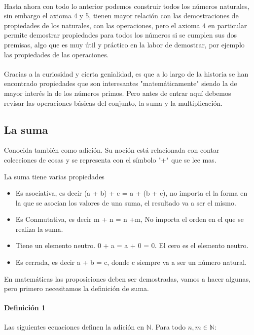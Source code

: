 \documentclass{article}
\begin{document}
\paragraph{} Hasta ahora con todo lo anterior podemos construir todos los números naturales, sin embargo el axioma 4 y 5, tienen mayor relación con las demostraciones de propiedades de los naturales, con las operaciones, pero el axioma 4 en particular permite demostrar propiedades para todos los números si se cumplen sus dos premisas, algo que es muy útil y práctico en la labor de demostrar, por ejemplo las propiedades de las operaciones.

\paragraph{} Gracias a la curiosidad y cierta genialidad, es que a lo largo de la historia se han encontrado propiedades que son interesantes "matemáticamente" siendo la de mayor interés la de los números primos. Pero antes de entrar aquí debemos revisar las operaciones básicas del conjunto, la suma y la multiplicación.

\subsection{La suma}

Conocida también como adición. Su noción está relacionada con contar colecciones de cosas y se representa con el símbolo "+" que se lee mas.

La suma tiene varias propiedades

\begin{itemize}
    \item Es asociativa, es decir (a + b) + c = a + (b + c), no importa el la forma en la que se asocian los valores de una suma, el resultado va a ser el mismo.
    \item Es Conmutativa, es decir m + n = n +m, No importa el orden en el que se realiza la suma.
    \item Tiene un elemento neutro.  0 + a = a + 0 = 0. El cero es el elemento neutro.
    \item Es cerrada, es decir a + b = c, donde c siempre va a ser un número natural.
\end{itemize}

En matemáticas las proposiciones deben ser demostradas, vamos a hacer algunas, pero primero necesitamos la definición de suma.

\paragraph{Definición 1}\cite{tnumprincip_2004}\label{def:sum} Las siguientes ecuaciones definen la adición en $\mathbb{N}$. Para todo $n,m \in \mathbb{N}$:
\end{document}
